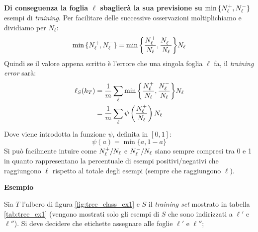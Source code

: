 \textbf{Di conseguenza la foglia $\ell$ sbaglierà la sua previsione su
$\min{\{\ensuremath{N_{\ell}^+},\ensuremath{N_{\ell}^-}\}}$} esempi di \textit{training}. Per facilitare delle successive
osservazioni moltiplichiamo e dividiamo per $N_{\ell}$:
$$ \min{\{\ensuremath{N_{\ell}^+},\ensuremath{N_{\ell}^-}\}} = 
\min{\left\{\frac{\ensuremath{N_{\ell}^+}}{N_{\ell}},\frac{\ensuremath{N_{\ell}^-}}{N_{\ell}}\right\}}N_{\ell} $$
Quindi se il valore appena scritto è l'errore che una singola foglia $\ell$ fa, il
\textit{training error} sarà:
$$ 
\begin{aligned}
\ell_{S}(h_T)
&=\frac{1}{m}\sum_{\ell}\min{\left\{\frac{\ensuremath{N_{\ell}^+}}{N_{\ell}},\frac{\ensuremath{N_{\ell}^-}}{N_{\ell}}
\right\}}N_{\ell}\\
&=\frac{1}{m}\sum_{\ell} \psi \left(\frac{N_{\ell}^+}{N_{\ell}}\right)N_{\ell}\\
\end{aligned}
$$
Dove viene introdotta la funzione $\psi$, definita in $[0,1]$:
$$\psi(a) = \min{\{a,1-a\}}$$
Si può facilmente intuire come $N_{\ell}^+/N_{\ell}$ e $N_{\ell}^-/N_{\ell}$ siano
sempre compresi tra 0 e 1 in quanto rappresentano la percentuale di esempi 
positivi/negativi che raggiungono $\ell$ rispetto al totale degli esempi 
(sempre che raggiungono $\ell$).

\textbf{Esempio}

Sia $T$ l'albero di figura \ref{fig:tree_class_ex1} e $S$ il \textit{training set}
mostrato in tabella \ref{tab:tree_ex1} (vengono mostrati solo gli esempi di $S$ che
sono indirizzati a $\ell'$ e $\ell''$).
Si deve decidere che etichette assegnare alle foglie $\ell'$ e $\ell''$;


